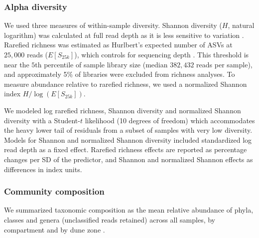 \documentclass[fleqn,10pt,numbers]{olplainarticle}
\begin{document}
\subsubsection*{Alpha diversity}
We used three measures of within-sample diversity. Shannon diversity ($H$, natural logarithm) was calculated at full read depth as it is less sensitive to variation \cite{shirazi2021revisiting}. Rarefied richness was estimated as Hurlbert's expected number of ASVs at $25{,}000$ reads ($E[S_{25k}]$), which controls for sequencing depth \cite{hurlbert1971nonconcept}. This threshold is near the $5$th percentile of sample library size (median $382{,}432$ reads per sample), and approximately 5\% of libraries were excluded from richness analyses. To measure abundance relative to rarefied richness, we used a normalized Shannon index $H/\log(E[S_{25k}])$.



We modeled log rarefied richness, Shannon diversity and normalized Shannon diversity with a Student-$t$ likelihood (10 degrees of freedom) which accommodates the heavy lower tail of residuals from a subset of samples with very low diversity.
Models for Shannon and normalized Shannon diversity included standardized log read depth as a fixed effect. Rarefied richness effects are reported as percentage changes per SD of the predictor, and Shannon and normalized Shannon effects as differences in index units.


\subsubsection*{Community composition}
We summarized taxonomic composition as the mean relative abundance of phyla, classes and genera (unclassified reads retained) across all samples, by compartment and by dune zone \cite{edgell2006arabian}.

\end{document}
